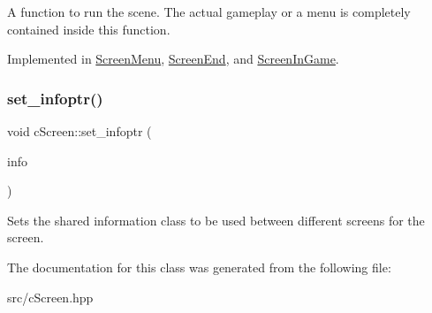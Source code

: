 A function to run the scene. The actual gameplay or a menu is completely contained inside this function. 

Implemented in \hyperlink{classScreenMenu_a86af8a6c97bf315bbe88cd2d7ab35abf}{Screen\+Menu}, \hyperlink{classScreenEnd_a3582fcab70f5568fcdc187feeb1383ad}{Screen\+End}, and \hyperlink{classScreenInGame_a55d4f45872f6d488145d1cf71819b960}{Screen\+In\+Game}.

\hypertarget{classcScreen_aa741f84e247decd04cb714bc1c33f93d}{}\label{classcScreen_aa741f84e247decd04cb714bc1c33f93d} 
\subsubsection{\texorpdfstring{set\+\_\+infoptr()}{set\_infoptr()}}
{\footnotesize\ttfamily void c\+Screen\+::set\+\_\+infoptr (\begin{DoxyParamCaption}\item[{std\+::shared\+\_\+ptr$<$ \hyperlink{classGameInfo}{Game\+Info} $>$}]{info }\end{DoxyParamCaption})\hspace{0.3cm}{\ttfamily [inline]}}

Sets the shared information class to be used between different screens for the screen. 

The documentation for this class was generated from the following file\+:\begin{DoxyCompactItemize}
\item 
src/c\+Screen.\+hpp\end{DoxyCompactItemize}
